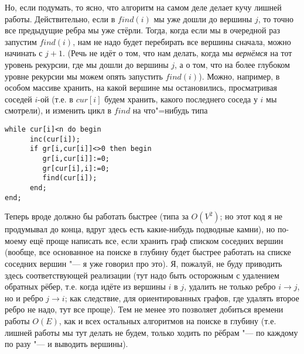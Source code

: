 Но, если подумать, то ясно, что алгоритм на самом деле делает кучу лишней работы. Действительно, 
если в $find(i)$ мы уже дошли до вершины $j$, то точно все предыдущие ребра мы уже стёрли. Тогда, 
когда если мы в очередной раз запустим $find(i)$, нам не надо будет перебирать все вершины сначала, 
можно начинать с $j+1$. (Речь не идёт о том, что нам делать, когда мы \textit{вернёмся} на тот 
уровень рекурсии, где мы дошли до вершины $j$, а о том, что на более глубоком уровне рекурсии мы 
можем опять запустить $find(i)$). Можно, например, в особом массиве хранить, на какой вершине мы 
остановились, просматривая соседей $i$-ой (т.е. в $cur[i]$ будем хранить, какого последнего соседа 
у $i$ мы смотрели), и изменить цикл в $find$ на что"=нибудь типа
\begin{codesampleo}\begin{verbatim}
while cur[i]<n do begin
      inc(cur[i]);
      if gr[i,cur[i]]<>0 then begin
         gr[i,cur[i]]:=0;
         gr[cur[i],i]:=0;
         find(cur[i]);
      end;
end;
\end{verbatim}\end{codesampleo}

Теперь вроде должно бы работать быстрее (типа за $O(V^2)$; но этот код я не продумывал до конца,
вдруг здесь есть какие-нибудь подводные камни), но по-моему ещё проще написать все, если хранить 
граф списком соседних вершин (вообще, все основанное на поиске в глубину будет быстрее работать 
на списке соседних вершин "--- я уже говорил про это). Я, пожалуй, не буду приводить здесь 
соответствующей реализации (тут надо быть осторожным с удалением обратных рёбер, т.е. когда идёте 
из вершины $i$ в $j$, удалить не только ребро $i\to j$, но и ребро $j\to i$; как следствие, для 
ориентированных графов, где удалять второе ребро не надо, тут все проще). Тем не менее это 
позволяет добиться времени работы $O(E)$, как и всех остальных алгоритмов на поиске в глубину (т.е. 
лишней работы мы тут делать не будем, только ходить по рёбрам "--- по каждому по разу "--- и 
выводить вершины).